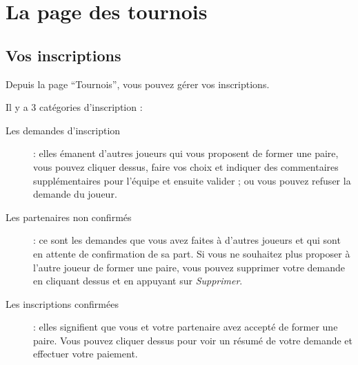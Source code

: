 \section{La page des tournois}

\subsection{Vos inscriptions}

Depuis la page \enquote{Tournois}, vous pouvez gérer vos inscriptions. \newline

Il y a 3 catégories d'inscription : \newline

\begin{description}
    \item[Les demandes d'inscription] : elles émanent d'autres joueurs qui
    vous proposent de former une paire, vous pouvez cliquer dessus, faire vos
    choix et indiquer des commentaires supplémentaires pour l'équipe et ensuite
    valider ; ou vous pouvez refuser la demande du joueur.
    \item[Les partenaires non confirmés] : ce sont les demandes que vous avez
    faites à d'autres joueurs et qui sont en attente de confirmation de sa part.
    Si vous ne souhaitez plus proposer à l'autre joueur de former une paire,
    vous pouvez supprimer votre demande en cliquant dessus et en appuyant sur
    \textit{Supprimer}.
    \item[Les inscriptions confirmées] : elles signifient que vous et votre
    partenaire avez accepté de former une paire. Vous pouvez cliquer dessus
    pour voir un résumé de votre demande et effectuer votre paiement.
\end{description}
